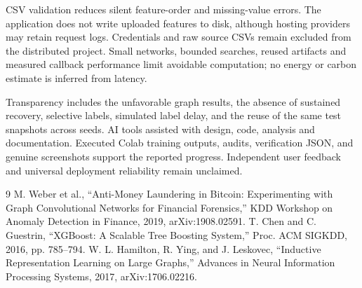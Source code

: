 \documentclass[conference]{IEEEtran}
\begin{document}
CSV validation reduces silent feature-order and missing-value errors. The application does not write uploaded features to disk, although hosting providers may retain request logs. Credentials and raw source CSVs remain excluded from the distributed project. Small networks, bounded searches, reused artifacts and measured callback performance limit avoidable computation; no energy or carbon estimate is inferred from latency.

Transparency includes the unfavorable graph results, the absence of sustained recovery, selective labels, simulated label delay, and the reuse of the same test snapshots across seeds. AI tools assisted with design, code, analysis and documentation. Executed Colab training outputs, audits, verification JSON, and genuine screenshots support the reported progress. Independent user feedback and universal deployment reliability remain unclaimed.

\begin{thebibliography}{9}
 M. Weber et al., ``Anti-Money Laundering in Bitcoin: Experimenting with Graph Convolutional Networks for Financial Forensics,'' KDD Workshop on Anomaly Detection in Finance, 2019, arXiv:1908.02591.
 T. Chen and C. Guestrin, ``XGBoost: A Scalable Tree Boosting System,'' Proc. ACM SIGKDD, 2016, pp. 785--794.
 W. L. Hamilton, R. Ying, and J. Leskovec, ``Inductive Representation Learning on Large Graphs,'' Advances in Neural Information Processing Systems, 2017, arXiv:1706.02216.
\end{thebibliography}
\end{document}
